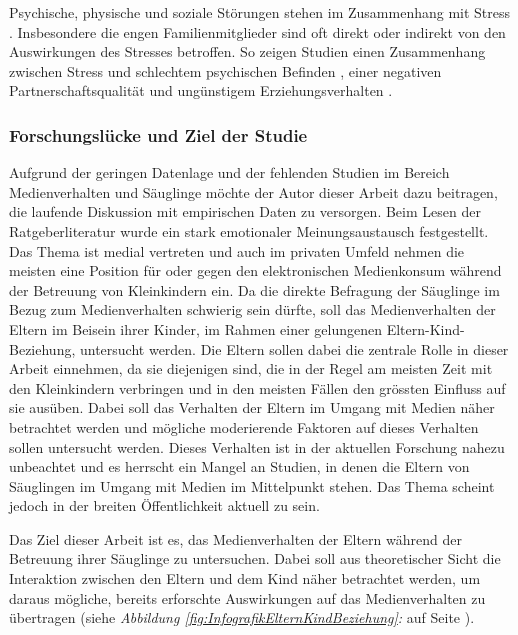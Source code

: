 Psychische, physische und soziale Störungen stehen im Zusammenhang mit Stress \cite{Elfering2002, Burisch1994}. Insbesondere die engen Familienmitglieder sind oft direkt oder indirekt von den Auswirkungen des Stresses betroffen. So zeigen Studien einen Zusammenhang zwischen Stress und schlechtem psychischen Befinden \cite{Burisch1994, Krohne1997}, einer negativen Partnerschaftsqualität  \nohyphens{\cite{Bodenmann2000, Bodenmann1999, Bodenmann2000a}} und ungünstigem Erziehungsverhalten  \nohyphens{\cite{Abidin1992, Belsky1984, WebsterStratton2000}}.

\subsubsection{Forschungslücke und Ziel der Studie}
Aufgrund der geringen Datenlage und der fehlenden Studien im Bereich Medienverhalten und Säuglinge möchte der Autor dieser Arbeit dazu beitragen, die laufende Diskussion mit empirischen Daten zu versorgen. Beim Lesen der Ratgeberliteratur wurde ein stark emotionaler Meinungsaustausch festgestellt. Das Thema ist medial vertreten und auch im privaten Umfeld nehmen die meisten eine Position für oder gegen den elektronischen Medienkonsum während der Betreuung von Kleinkindern ein. Da die direkte Befragung der Säuglinge im Bezug zum Medienverhalten schwierig sein dürfte, soll das Medienverhalten der Eltern im Beisein ihrer Kinder, im Rahmen einer gelungenen Eltern-Kind-Beziehung, untersucht werden. Die Eltern sollen dabei die zentrale Rolle in dieser Arbeit einnehmen, da sie diejenigen sind, die in der Regel am meisten Zeit mit den Kleinkindern verbringen und in den meisten Fällen den grössten Einfluss auf sie ausüben. Dabei soll das Verhalten der Eltern im Umgang mit Medien näher betrachtet werden und mögliche moderierende Faktoren auf dieses Verhalten sollen untersucht werden. Dieses Verhalten ist in der aktuellen Forschung nahezu unbeachtet und es herrscht ein Mangel an Studien, in denen die Eltern von Säuglingen im Umgang mit Medien im Mittelpunkt stehen. Das Thema scheint jedoch in der breiten Öffentlichkeit aktuell zu sein. 

Das Ziel dieser Arbeit ist es, das Medienverhalten der Eltern während der Betreuung ihrer Säuglinge zu untersuchen. Dabei soll aus theoretischer Sicht die Interaktion  zwischen den Eltern und dem Kind näher betrachtet werden, um daraus mögliche, bereits erforschte Auswirkungen auf das Medienverhalten zu übertragen (siehe \textit{Abbildung \ref{fig:InfografikElternKindBeziehung}: } auf Seite \pageref{fig:InfografikElternKindBeziehung}). 

